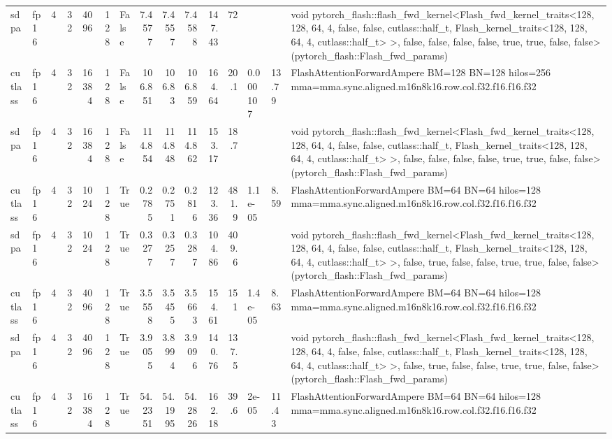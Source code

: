\begin{table}[htbp]
\begin{tabular}{llrrrrlrrrrrlll}
    sdpa & fp16 & 4 & 32 & 4096 & 128 & False & 7.4577 & 7.4557 & 7.4588 & 147.43 & 72 &  &  & void pytorch\_flash::flash\_fwd\_kernel<Flash\_fwd\_kernel\_traits<128, 128, 64, 4, false, false, cutlass::half\_t, Flash\_kernel\_traits<128, 128, 64, 4, cutlass::half\_t> >, false, false, false, false, true, true, false, false>(pytorch\_flash::Flash\_fwd\_params) \\
    cutlass & fp16 & 4 & 32 & 16384 & 128 & False & 106.851 & 106.83 & 106.859 & 164.64 & 20.1 & 0.000107 & 13.79 & FlashAttentionForwardAmpere BM=128 BN=128 hilos=256 mma=mma.sync.aligned.m16n8k16.row.col.f32.f16.f16.f32 \\
    sdpa & fp16 & 4 & 32 & 16384 & 128 & False & 114.854 & 114.848 & 114.862 & 153.17 & 18.7 &  &  & void pytorch\_flash::flash\_fwd\_kernel<Flash\_fwd\_kernel\_traits<128, 128, 64, 4, false, false, cutlass::half\_t, Flash\_kernel\_traits<128, 128, 64, 4, cutlass::half\_t> >, false, false, false, false, true, true, false, false>(pytorch\_flash::Flash\_fwd\_params) \\
    cutlass & fp16 & 4 & 32 & 1024 & 128 & True & 0.2785 & 0.2751 & 0.2816 & 123.36 & 481.9 & 1.1e-05 & 8.59 & FlashAttentionForwardAmpere BM=64 BN=64 hilos=128 mma=mma.sync.aligned.m16n8k16.row.col.f32.f16.f16.f32 \\
    sdpa & fp16 & 4 & 32 & 1024 & 128 & True & 0.3277 & 0.3257 & 0.3287 & 104.86 & 409.6 &  &  & void pytorch\_flash::flash\_fwd\_kernel<Flash\_fwd\_kernel\_traits<128, 128, 64, 4, false, false, cutlass::half\_t, Flash\_kernel\_traits<128, 128, 64, 4, cutlass::half\_t> >, false, true, false, false, true, true, false, false>(pytorch\_flash::Flash\_fwd\_params) \\
    cutlass & fp16 & 4 & 32 & 4096 & 128 & True & 3.5558 & 3.5455 & 3.5663 & 154.61 & 151 & 1.4e-05 & 8.63 & FlashAttentionForwardAmpere BM=64 BN=64 hilos=128 mma=mma.sync.aligned.m16n8k16.row.col.f32.f16.f16.f32 \\
    sdpa & fp16 & 4 & 32 & 4096 & 128 & True & 3.9055 & 3.8994 & 3.9096 & 140.76 & 137.5 &  &  & void pytorch\_flash::flash\_fwd\_kernel<Flash\_fwd\_kernel\_traits<128, 128, 64, 4, false, false, cutlass::half\_t, Flash\_kernel\_traits<128, 128, 64, 4, cutlass::half\_t> >, false, true, false, false, true, true, false, false>(pytorch\_flash::Flash\_fwd\_params) \\
    cutlass & fp16 & 4 & 32 & 16384 & 128 & True & 54.2351 & 54.1995 & 54.2826 & 162.18 & 39.6 & 2e-05 & 11.43 & FlashAttentionForwardAmpere BM=64 BN=64 hilos=128 mma=mma.sync.aligned.m16n8k16.row.col.f32.f16.f16.f32 \\

\end{tabular}
\end{table}
